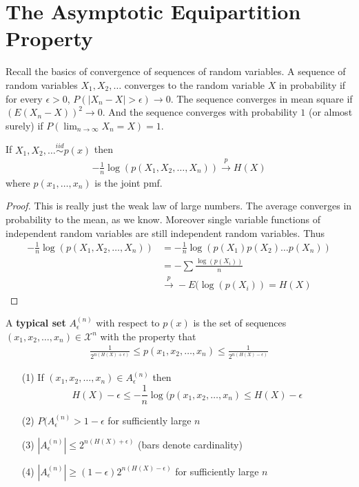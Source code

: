 \section{The Asymptotic Equipartition Property}
Recall the basics of convergence of sequences of random variables. A sequence of random variables $X_1,X_2,\ldots$ converges to the random variable $X$ in probability if for every $\epsilon > 0$, $P(|X_n - X| > \epsilon) \to 0$. The sequence converges in mean square if $(E(X_n - X))^2 \to 0$. And the sequence converges with probability $1$ (or almost surely) if $P(\lim_{n \to \infty} X_n = X) = 1$.
\begin{theorem}
	If $X_1,X_2,\ldots \overset{iid}{\sim} p(x)$ then
\begin{align}
	-\frac{1}{n}\log(p(X_1,X_2,\ldots,X_n)) \overset{p}{\to} H(X)
\end{align}
where $p(x_1,\ldots,x_n)$ is the joint pmf. 
\end{theorem}
\begin{proof}
	This is really just the weak law of large numbers. The average converges in probability to the mean, as we know. Moreover single variable functions of independent random variables are still independent random variables. Thus
\begin{align}
	-\frac{1}{n}\log(p(X_1,X_2,\ldots,X_n)) &= -\frac{1}{n}\log(p(X_1)p(X_2)\ldots p(X_n)) \\
	&= -\sum \frac{\log(p(X_i))}{n} \\
	&\overset{p}{\to} -E(\log(p(X_i)) = H(X) 
\end{align}
\end{proof}
\begin{definition}
	A \textbf{typical set} $A_{\epsilon}^{(n)}$ with respect to $p(x)$ is the set of sequences $(x_1,x_2,\ldots,x_n) \in \mathcal{X}^n$ with the property that
	\begin{align}
		\frac{1}{2^{n(H(X)+\epsilon)}} \leq p(x_1,x_2,\ldots,x_n) \leq \frac{1}{2^{n(H(X)-\epsilon)}}
	\end{align}
\end{definition}
\begin{theorem}
	\begin{itemize}
		\item[(1)] If $(x_1,x_2,\ldots,x_n) \in A^{(n)}_{\epsilon}$ then
		\[ H(X) - \epsilon \leq -\frac{1}{n}\log(p(x_1,x_2,\ldots,x_n) \leq H(X)-\epsilon \]
		\item[(2)] $P(A^{(n)}_{\epsilon} > 1-\epsilon$ for sufficiently large $n$
		\item[(3)] $|A^{(n)}_{\epsilon}| \leq 2^{n(H(X)+\epsilon)}$ (bars denote cardinality)
		\item[(4)] $|A^{(n)}_{\epsilon}| \geq (1-\epsilon)2^{n(H(X)-\epsilon)}$ for sufficiently large $n$
	\end{itemize}
\end{theorem}
